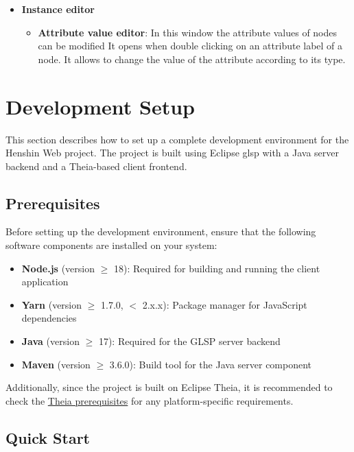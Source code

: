 \begin{itemize}
\begin{itemize}
    \end{itemize}
    \item \textbf{Instance editor}
    \begin{itemize}
        \item \textbf{Attribute value editor}: In this window the attribute values of nodes can be modified It opens when double clicking on an attribute label of a node. It allows to change the value of the attribute according to its type.
    \end{itemize}
\end{itemize}


\section{Development Setup}
\label{sec:dev_setup}

This section describes how to set up a complete development environment for the Henshin Web project. The project is built using Eclipse \ac{glsp} with a Java server backend and a Theia-based client frontend.

\subsection{Prerequisites}
\label{subsec:prerequisites}

Before setting up the development environment, ensure that the following software components are installed on your system:

\begin{itemize}
    \item \textbf{Node.js} (version $\geq$ 18): Required for building and running the client application
    \item \textbf{Yarn} (version $\geq$ 1.7.0, $<$ 2.x.x): Package manager for JavaScript dependencies
    \item \textbf{Java} (version $\geq$ 17): Required for the GLSP server backend
    \item \textbf{Maven} (version $\geq$ 3.6.0): Build tool for the Java server component
\end{itemize}

Additionally, since the project is built on Eclipse Theia, it is recommended to check the \href{https://github.com/eclipse-theia/theia/blob/master/doc/Developing.md\#prerequisites}{Theia prerequisites} for any platform-specific requirements.

\subsection{Quick Start}
\label{subsec:quick_start}

